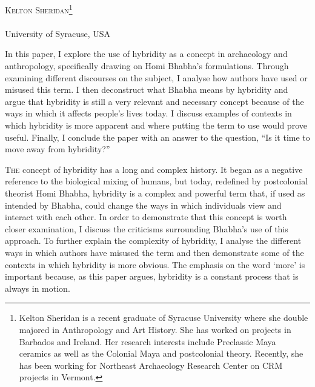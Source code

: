 \openingarticle
\def\ppages{\pagerange{Sheridan:firstpage}{Sheridan:lastpage}}
\def\shorttitle{A Case for Hybridity}
\def\maintitle{A Case for Hybridity}
\def\shortauthor{Kelton Sheridan}
\def\authormail{kmsherid@syr.edu}
\def\affiliation{University of Syracuse, USA}
\def\thanknote{\footnote{Kelton Sheridan is a recent graduate of Syracuse University where she double majored in Anthropology and Art History. She has worked on projects in Barbados and Ireland. Her research interests include Preclassic Maya ceramics as well as the Colonial Maya and postcolonial theory. Recently, she has been working for Northeast Archaeology Research Center on CRM projects in Vermont.}}
\mychapter{\maintitle}
\begin{center}
	{\Large\scshape\shortauthor \thanknote}\\[1em]
	\email \\
	\affiliation
\end{center}
\vspace{3em}
\midarticle
\label{Sheridan:firstpage}
	\begin{myabstract}

In this paper, I explore the use of hybridity as a concept in archaeology and anthropology, specifically drawing on Homi Bhabha’s formulations. Through examining different discourses on the subject, I analyse how authors have used or misused this term. I then deconstruct what Bhabha means by hybridity and argue that hybridity is still a very relevant and necessary concept because of the ways in which it affects people’s lives today. I discuss examples of contexts in which hybridity is more apparent and where putting the term to use would prove useful. Finally, I conclude the paper with an answer to the question, “Is it time to move away from hybridity?”

	\end{myabstract}

\lettrine[nindent=0em,lines=3]{T}{he} concept of hybridity has a long and complex history. It began as a negative reference to the biological mixing of humans, but today, redefined by postcolonial theorist Homi Bhabha, hybridity is a complex and powerful term that, if used as intended by Bhabha, could change the ways in which individuals view and interact with each other. In order to demonstrate that this concept is worth closer examination, I discuss the criticisms surrounding Bhabha’s use of this approach. To further explain the complexity of hybridity, I analyse the different ways in which authors have misused the term and then demonstrate some of the contexts in which hybridity is more obvious. The emphasis on the word ‘more’ is important because, as this paper argues, hybridity is a constant process that is always in motion.

